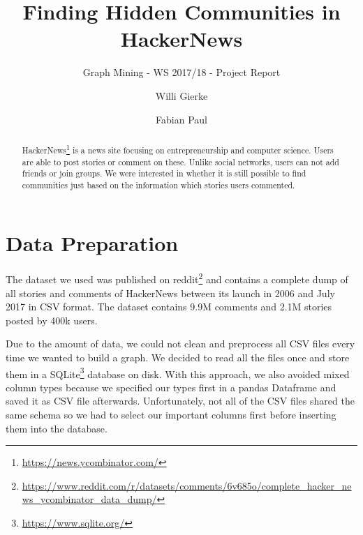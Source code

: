 \documentclass[sigconf]{acmart}
\title{Finding Hidden Communities in HackerNews}
\subtitle{Graph Mining - WS 2017/18 - Project Report}
\author{Willi Gierke}
\author{Fabian Paul}
\begin{document}



\begin{abstract}
HackerNews\footnote{\url{https://news.ycombinator.com/}} is a news site focusing on entrepreneurship and computer science.
Users are able to post stories or comment on these.
Unlike social networks, users can not add friends or join groups.
We were interested in whether it is still possible to find communities just based on the information which stories users commented.
\end{abstract}

\maketitle



\section{Data Preparation}



The dataset we used was published on reddit\footnote{\url{https://www.reddit.com/r/datasets/comments/6v685o/complete_hacker_news_ycombinator_data_dump/}} and contains a complete dump of all stories and comments of HackerNews between its launch in 2006 and July 2017 in CSV format.
The dataset contains 9.9M comments and 2.1M stories posted by 400k users. 

Due to the amount of data, we could not clean and preprocess all CSV files every time we wanted to build a graph. We decided to read all the files once and store them in a SQLite\footnote{\url{https://www.sqlite.org/}} database on disk. With this approach, we also avoided mixed column types because we specified our types first in a pandas Dataframe and saved it as CSV file afterwards.
Unfortunately, not all of the CSV files shared the same schema so we had to select our important columns first before inserting them into the database. 
\end{document}
